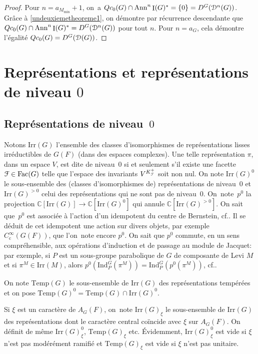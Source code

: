 \documentclass[11pt]{article}
\newcommand{\cf}{cf.\xspace}
\numberwithin{equation}{section}\providecommand{\og}{«\,}\providecommand{\fg}{\,»}
\let\mathcal \EuScript
\newcommand{\Ann}{\mathrm{Ann}}
\newcommand{\rc}{\mathrm{c}}
\newcommand{\Fac}{\mathrm{Fac}}
\newcommand{\Ind}{\mathrm{Ind}}
\newcommand{\Irr}{\mathrm{Irr}}
\newcommand{\Temp}{\mathrm{Temp}}
\DeclareMathOperator{\rI}{I}
\newcommand{\cD}{\mathcal{D}}
\newcommand{\cF}{\mathcal{F}}
\newcommand{\CC}{\mathbb{C}}
\theoremstyle{plain}
\theoremstyle{definition}
\begin{document}
\begin{proof}
Pour $n=a_{M_{\min}}+1$, on~a $Qc_{0}(G)\cap \Ann^n\rI(G)^*=\{0\}=D^G(\cD^n(G))$. Grâce à \eqref{undeuxiemetheoreme1}, on démontre par récurrence descendante que $Qc_{0}(G)\cap \Ann^n\rI(G)^*=D^G(\cD^n(G))$ pour tout $n$. Pour $n=a_{G}$, cela démontre l'égalité $Qc_{0}(G)=D^G(\cD(G))$.
\end{proof}

\section{Représentations et représentations de niveau \texorpdfstring{$0$}{0}}\label{representations}

\subsection{Représentations de niveau~\texorpdfstring{$0$}{0}}
Notons $\Irr(G)$ l'ensemble des classes d'isomorphismes de représentations lisses irréductibles de $G(F)$ (dans des espaces complexes). Une telle représentation $\pi$, dans un espace $V$, est dite de niveau~$0$ si et seulement s'il existe une facette $\cF\in \Fac(G)$ telle que l'espace des invariants $V^{K_{\cF}^+}$ soit non nul. On note $\Irr(G)^0$ le sous-ensemble des (classes d'isomorphismes de) représentations de niveau~$0$ et $\Irr(G)^{>0}$ celui des représentations qui ne sont pas de niveau~$0$. On~note~$p^0 $ la projection $\CC[\Irr(G)]\to \CC[\Irr(G)^0]$ qui annule $\CC[\Irr(G)^{>0}]$. On sait que~$p^0$ est associée à l'action d'un idempotent du centre de Bernstein, \cf \cite[Cor.\,3.9(i)]{B}. Il se déduit de cet idempotent une action sur divers objets, par exemple $C_{\rc}^{\infty}(G(F))$, que l'on~note encore $p^0$. On sait que $p^0$ commute, en un sens compréhensible, aux opérations d'induction et de passage au module de Jacquet: par exemple, si $P$ est un sous-groupe parabolique de $G$ de composante de Levi $M$ et si $\pi^M\in \Irr(M)$, alors $p^0(\Ind_{P}^G(\pi^M))=\Ind_{P}^G(p^0(\pi^M))$, \cf \cite[Th.\,5.2]{MP}.

On note $\Temp(G)$ le sous-ensemble de $\Irr(G)$ des représentations tempérées et on pose $\Temp(G)^0=\Temp(G)\cap \Irr(G)^0$.

Si $\xi$ est un caractère de $A_{G}(F)$, on~note $\Irr(G)_{\xi}$ le sous-ensemble de $\Irr(G)$ des représentations dont le caractère central coïncide avec $\xi$ sur $A_{G}(F)$. On définit de même $\Irr(G)_{\xi}^0$, $\Temp(G)_{\xi}$ etc. Évidemment, $\Irr(G)_{\xi}^0$ est vide si $\xi$ n'est pas modérément ramifié et $\Temp(G)_{\xi}$ est vide si $\xi$ n'est pas unitaire.
\end{document}
